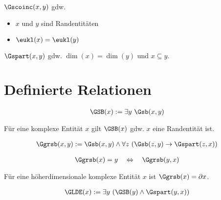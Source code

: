 \begin{dfn}
    $\Gscoinc(x,y)$ gdw.
    \begin{itemize}
        \item $x$ und $y$ sind Randentitäten
        \item $\eukl(x) = \eukl(y)$
    \end{itemize}
\end{dfn}

\begin{dfn}
    $\Gspart(x,y)$ gdw. $\dim(x) = \dim(y)$ und $x \subseteq y$.
\end{dfn}


\section{Definierte Relationen}


\begin{erin}
    \begin{align*}
        \GSB(x) := \exists y\ \Gsb(x,y)
    \end{align*}
\end{erin}

\begin{hyp}
    Für eine komplexe Entität $x$ gilt $\GSB(x)$ gdw. $x$ eine Randentität ist.
\end{hyp}

\begin{erin}
    \begin{align*}
        \Ggrsb(x,y) := \Gsb(x,y) \wedge \forall z\ (\Gsb(z,y) \to \Gspart(z,x))
    \end{align*}
\end{erin}

\begin{erin}
    \begin{align*}
        \Ggrsb(x) = y \quad \Leftrightarrow \quad \Ggrsb(y,x)
    \end{align*}
\end{erin}

\begin{hyp}
    Für eine höherdimensionale komplexe Entität $x$ ist $\Ggrsb(x) = \partial x$.
\end{hyp}

 
\begin{erin}
    \begin{align*}
        \GLDE(x) := \exists y\ (\GSB(y) \wedge \Gspart(y, x))
    \end{align*}
\end{erin}

